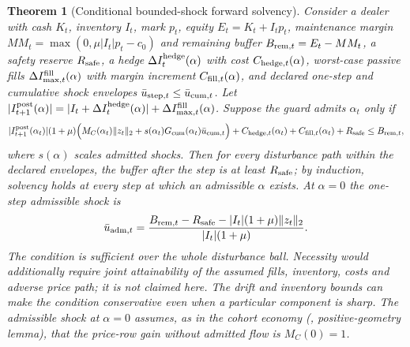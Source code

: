 \documentclass[12pt]{article}
\newtheorem{theorem}{Theorem}[section]
\theoremstyle{definition}
\theoremstyle{remark}
\begin{document}
\begin{theorem}[Conditional bounded-shock forward solvency]\label{thm:forward}
Consider a dealer with cash $K_t$, inventory $I_t$, mark $p_t$, equity $E_t=K_t+I_tp_t$, maintenance margin $MM_t=\max(0,\mu|I_t|p_t-c_0)$ and remaining buffer $B_{{\rm rem},t}=E_t-MM_t$, a safety reserve $R_{\rm safe}$, a hedge $\Delta I^{\rm hedge}_t(\alpha)$ with cost $C_{{\rm hedge},t}(\alpha)$, worst-case passive fills $\Delta I^{\rm fill}_{\max,t}(\alpha)$ with margin increment $C_{{\rm fill},t}(\alpha)$, and declared one-step and cumulative shock envelopes $\bar u_{{\rm step},t}\le\bar u_{{\rm cum},t}$. Let $|I^{\rm post}_{t+1}(\alpha)|=|I_t+\Delta I^{\rm hedge}_t(\alpha)|+\Delta I^{\rm fill}_{\max,t}(\alpha)$. Suppose the guard admits $\alpha_t$ only if
\begin{equation}\label{eq:guardineq}
|I^{\rm post}_{t+1}(\alpha_t)|(1+\mu)\Bigl(M_{C}(\alpha_t)\|z_t\|_2+s(\alpha_t)G_{\rm cum}(\alpha_t)\bar u_{{\rm cum},t}\Bigr)+C_{{\rm hedge},t}(\alpha_t)+C_{{\rm fill},t}(\alpha_t)+R_{\rm safe}\le B_{{\rm rem},t},
\end{equation}
where $s(\alpha)$ scales admitted shocks. Then for every disturbance path within the declared envelopes, the buffer after the step is at least $R_{\rm safe}$; by induction, solvency holds at every step at which an admissible $\alpha$ exists. At $\alpha=0$ the one-step admissible shock is
\[
\bar u_{{\rm adm},t}=\frac{B_{{\rm rem},t}-R_{\rm safe}-|I_t|(1+\mu)\|z_t\|_2}{|I_t|(1+\mu)} .
\]
The condition is sufficient over the whole disturbance ball. Necessity would additionally require joint attainability of the assumed fills, inventory, costs and adverse price path; it is not claimed here. The drift and inventory bounds can make the condition conservative even when a particular component is sharp. The admissible shock at $\alpha=0$ assumes, as in the cohort economy (\citealp{niroula2026}, positive-geometry lemma), that the price-row gain without admitted flow is $M_C(0)=1$.
\end{theorem}
\end{document}
